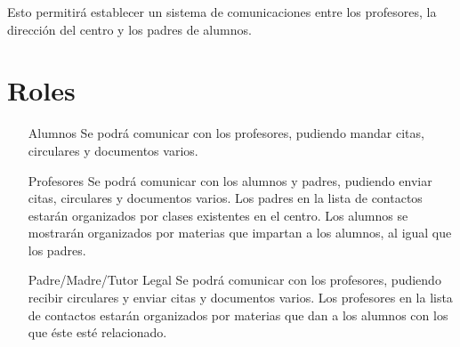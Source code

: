 Esto permitir\'a establecer un sistema de comunicaciones entre los profesores, la direcci\'on del centro y los padres de alumnos.

\section{Roles}

	\begin{itemize}
		\item[Alumnos] Se podr\'a comunicar con los profesores, pudiendo mandar citas, circulares y documentos varios.
		\item[Profesores] Se podr\'a comunicar con los alumnos y padres, pudiendo enviar citas, circulares y documentos varios. Los padres en la lista de contactos estar\'an organizados por clases existentes en el centro. Los alumnos se mostrar\'an organizados por materias que impartan a los alumnos, al igual que los padres.
		\item[Padre/Madre/Tutor Legal] Se podr\'a comunicar con los profesores, pudiendo recibir circulares y enviar citas y documentos varios. Los profesores en la lista de contactos estar\'an organizados por materias que dan a los alumnos con los que \'este est\'e relacionado.
	\end{itemize}